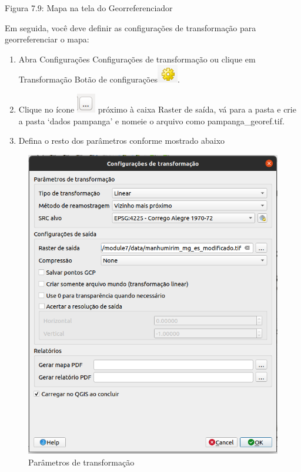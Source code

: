 \documentclass[
  portuguese,
]{krantz}
\providecommand{\tightlist}{%
  \setlength{\itemsep}{0pt}\setlength{\parskip}{0pt}}
\begin{document}
Figura 7.9: Mapa na tela do Georreferenciador

Em seguida, você deve definir as configurações de transformação para georreferenciar o mapa:

\begin{enumerate}
\def\labelenumi{\arabic{enumi}.}
\setcounter{enumi}{2}
\tightlist
\item
  Abra Configurações Configurações de transformação ou clique em Transformação Botão de configurações\includegraphics{media/modulo7/georef-settings-btn.png}.
\item
  Clique no ícone \includegraphics{media/modulo7/dots.png} próximo à caixa Raster de saída, vá para a pasta e crie a pasta `dados pampanga' e nomeie o arquivo como pampanga\_georef.tif.
\item
  Defina o resto dos parâmetros conforme mostrado abaixo
\end{enumerate}

\begin{figure}
\centering
\includegraphics{media/modulo7/transformation-settings.png}
\caption{Parâmetros de transformação}
\end{figure}
\end{document}
